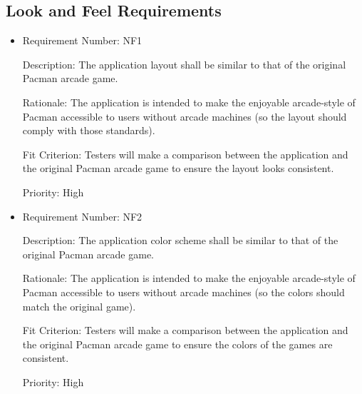 \documentclass[12pt, titlepage]{article}
\begin{document}
\subsection{Look and Feel Requirements}
\begin{itemize}
	\item
	Requirement Number: NF1

	Description: The application layout shall be similar to that of the original Pacman arcade game.

	Rationale: The application is intended to make the enjoyable arcade-style of Pacman accessible to users without arcade machines (so the layout should comply with those standards).

	Fit Criterion: Testers will make a comparison between the application and the original Pacman arcade game to ensure the layout looks consistent.

	Priority: High

	\item
	Requirement Number: NF2

	Description: The application color scheme shall be similar to that of the original Pacman arcade game.

	Rationale: The application is intended to make the enjoyable arcade-style of Pacman accessible to users without arcade machines (so the colors should match the original game).

	Fit Criterion: Testers will make a comparison between the application and the original Pacman arcade game to ensure the colors of the games are consistent.

	Priority: High
\end{itemize}
\end{document}

